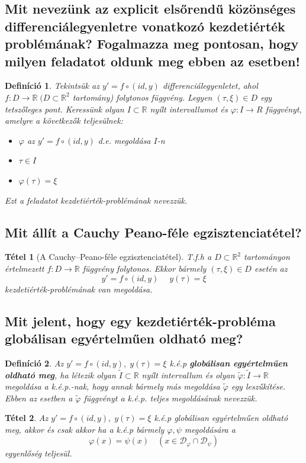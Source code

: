\documentclass[12pt,a4paper]{article}
\newcommand{\R}{\mathbb{R}}
\newcommand{\CD}{\mathcal{D}}
\newcommand{\f}{\varphi}
\newcommand{\bb}[1]{\left( #1 \right)}
\newtheorem{tet}{Tétel}[section]
\newtheorem{defi}{Definíció}[section]
\begin{document}
\subsection{Mit nevezünk az explicit elsőrendű közönséges differenciálegyenletre vonatkozó kezdetiérték problémának? Fogalmazza meg pontosan, hogy milyen feladatot oldunk meg ebben az esetben!}
\begin{defi}
Tekintsük az $y' = f \circ (id, y)$ differenciálegyenletet, ahol $f : D \to \R \; (D \subset \R^2$ tartomány) folytonos függvény. Legyen $(\tau, \xi) \in D$ egy tetszőleges pont. Keressünk olyan $I \subset \R$ nyílt intervallumot és $\f : I \to R$ függvényt, amelyre a következők teljesülnek:
\begin{itemize}
\item $\f$ az $y' = f \circ (id,y)$ d.e. megoldása $I$-n
\item $\tau \in I$
\item $\f(\tau) = \xi$ 
\end{itemize} 
Ezt a feladatot kezdetiérték-problémának nevezzük.
\end{defi}
\subsection{Mit állít a Cauchy Peano-féle egzisztenciatétel?}
\begin{tet}[A Cauchy–Peano-féle egzisztenciatétel]
T.f.h a $D \subset \R^2$ tartományon értelmezett $f: D \to \R$ függvény folytonos. Ekkor bármely $\bb{\tau,\xi} \in D$ esetén az 
\[
y' = f \circ \bb{id,y} \quad \; y(\tau) = \xi
\]
kezdetiérték-problémának van megoldása.
\end{tet}
\subsection{Mit jelent, hogy egy kezdetiérték-probléma globálisan egyértelműen oldható meg?}
\begin{defi}
Az $y' = f \circ \bb{id,y}, \; y(\tau) = \xi$ k.é.p \textbf{globálisan egyértelműen oldható meg}, ha létezik olyan $\tilde{I} \subset \R$ nyílt intervallum és olyan $\tilde{\f}: \tilde{I} \to \R$ megoldása a k.é.p.-nak, hogy annak bármely más megoldása $\tilde{\f}$ egy leszűkítése. Ebben az esetben
a $\tilde{\f}$ függvényt a k.é.p. teljes megoldásának nevezzük.
\end{defi}
\begin{tet}
Az $y' = f \circ \bb{id,y}, \; y(\tau) = \xi$ k.é.p globálisan egyértelműen oldható meg, akkor és csak akkor ha a k.é.p bármely $\f,\psi$ megoldására a
\[
\f(x) = \psi(x) \quad \bb{x \in \CD_\f \cap \CD_\psi}
\]
egyenlőség teljesül.
\end{tet}
\end{document}
